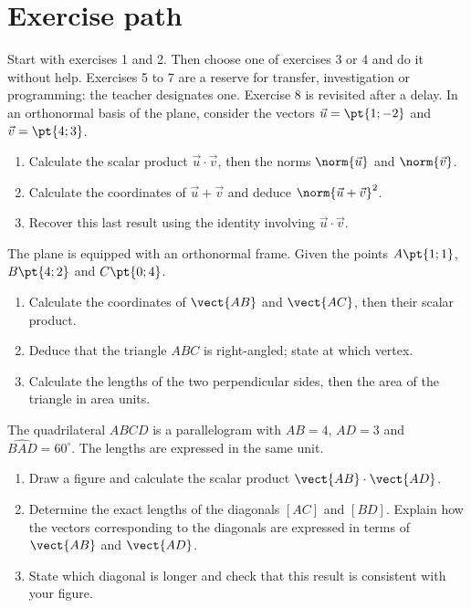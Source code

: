 \section*{Exercise path}\label{C03-PARC}
Start with exercises 1 and 2. Then choose one of exercises 3 or 4 and do it without help. Exercises 5 to 7 are a reserve for transfer, investigation or programming: the teacher designates one. Exercise 8 is revisited after a delay.
\begingroup
{}
In an orthonormal basis of the plane, consider the vectors $\vec u=\pt{1;-2}$ and $\vec v=\pt{4;3}$.
\begin{enumerate}[label=\arabic*.]
\item Calculate the scalar product $\vec u\cdot\vec v$, then the norms $\norm{\vec u}$ and $\norm{\vec v}$.
\item Calculate the coordinates of $\vec u+\vec v$ and deduce $\norm{\vec u+\vec v}^2$.
\item Recover this last result using the identity involving $\vec u\cdot\vec v$.
\end{enumerate}
The plane is equipped with an orthonormal frame. Given the points $A\pt{1;1}$, $B\pt{4;2}$ and $C\pt{0;4}$.
\begin{enumerate}[label=\arabic*.]
\item Calculate the coordinates of $\vect{AB}$ and $\vect{AC}$, then their scalar product.
\item Deduce that the triangle $ABC$ is right-angled; state at which vertex.
\item Calculate the lengths of the two perpendicular sides, then the area of the triangle in area units.
\end{enumerate}
The quadrilateral $ABCD$ is a parallelogram with $AB=4$, $AD=3$ and $\widehat{BAD}=60^\circ$. The lengths are expressed in the same unit.
\begin{enumerate}[label=\arabic*.]
\item Draw a figure and calculate the scalar product $\vect{AB}\cdot\vect{AD}$.
\item Determine the exact lengths of the diagonals $[AC]$ and $[BD]$. Explain how the vectors corresponding to the diagonals are expressed in terms of $\vect{AB}$ and $\vect{AD}$.
\item State which diagonal is longer and check that this result is consistent with your figure.
\end{enumerate}
